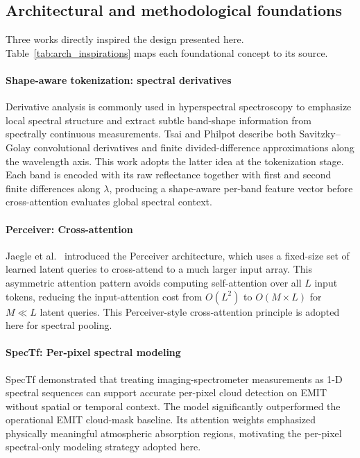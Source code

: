 \documentclass[preprint,12pt]{elsarticle}
\begin{document}
\subsection{Architectural and methodological foundations}
\label{sec:arch_inspirations}

Three works directly inspired the design presented here.
Table~\ref{tab:arch_inspirations} maps each foundational concept to its source.

\paragraph{Shape-aware tokenization: spectral derivatives}
Derivative analysis is commonly used in hyperspectral spectroscopy to emphasize local spectral structure and extract subtle band-shape information from spectrally continuous measurements. 
Tsai and Philpot \cite{tsai1998derivative} describe both Savitzky--Golay convolutional derivatives and finite divided-difference approximations along the wavelength axis. 
This work adopts the latter idea at the tokenization stage.
Each band is encoded with its raw reflectance together with first and second finite differences along $\lambda$, producing a shape-aware per-band feature vector before cross-attention evaluates global spectral context.

\paragraph{Perceiver: Cross-attention}
Jaegle et al.\ \cite{jaegle2021perceiver} introduced the Perceiver architecture, which uses a fixed-size set of learned latent queries to cross-attend to a much larger input array. 
This asymmetric attention pattern avoids computing self-attention over all $L$ input tokens, reducing the input-attention cost from $O(L^2)$ to $O(M \times L)$ for $M \ll L$ latent queries. 
This Perceiver-style cross-attention principle is adopted here for spectral pooling. 

\paragraph{SpecTf: Per-pixel spectral modeling}
SpecTf \cite{lee2025spectf} demonstrated that treating imaging-spectrometer measurements as 1-D spectral sequences can support accurate per-pixel cloud detection on EMIT without spatial or temporal context.
The model significantly outperformed the operational EMIT cloud-mask baseline.
Its attention weights emphasized physically meaningful atmospheric absorption regions, motivating the per-pixel spectral-only modeling strategy adopted here.
\end{document}
